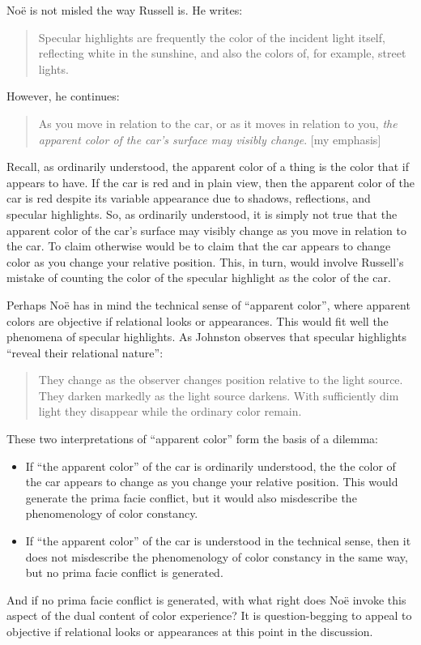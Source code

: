\documentclass[12pt]{article}
\begin{document}
Noë is not misled the way Russell is. He writes:
	\begin{quote}
		Specular highlights are frequently the color of the incident light itself, reflecting white in the sunshine, and also the colors of, for example, street lights. \citep[125]{Noe:2004fk}
	\end{quote}
However, he continues:
	\begin{quote}
		As you move in relation to the car, or as it moves in relation to you, \emph{the apparent color of the car's surface may visibly change}. [my emphasis] \citep[125]{Noe:2004fk}
	\end{quote}
Recall, as ordinarily understood, the apparent color of a thing is the color that if appears to have. If the car is red and in plain view, then the apparent color of the car is red despite its variable appearance due to shadows, reflections, and specular highlights. So, as ordinarily understood, it is simply not true that the apparent color of the car's surface may visibly change as you move in relation to the car. To claim otherwise would be to claim that the car appears to change color as you change your relative position. This, in turn, would involve Russell's mistake of counting the color of the specular highlight as the color of the car. 

Perhaps Noë has in mind the technical sense of ``apparent color'', where apparent colors are objective if relational looks or appearances. This would fit well the phenomena of specular highlights. As Johnston observes that specular highlights ``reveal their relational nature'':
	\begin{quote}
		They change as the observer changes position relative to the light source. They darken markedly as the light source darkens. With sufficiently dim light they disappear while the ordinary color remain. \citep[141]{Johnston:1992ck}
	\end{quote}

	These two interpretations of ``apparent color'' form the basis of a dilemma:
	\begin{itemize}
		\item If ``the apparent color'' of the car is ordinarily understood, the the color of the car appears to change as you change your relative position. This would generate the prima facie conflict, but it would also misdescribe the phenomenology of color constancy. 
		\item If ``the apparent color'' of the car is understood in the technical sense, then it does not misdescribe the phenomenology of color constancy in the same way, but no prima facie conflict is generated. 
	\end{itemize}
And if no prima facie conflict is generated, with what right does Noë invoke this aspect of the dual content of color experience? It is question-begging to appeal to objective if relational looks or appearances at this point in the discussion.
\end{document}
